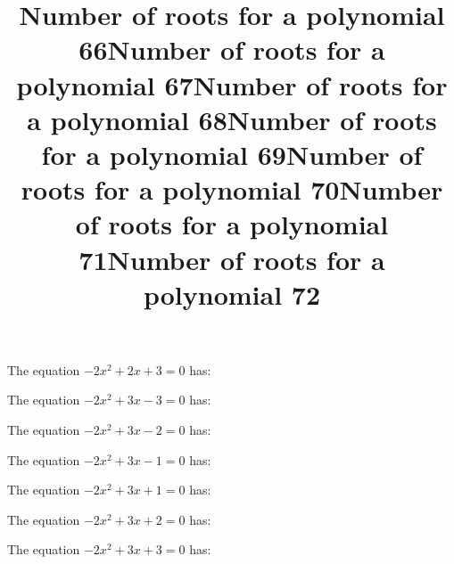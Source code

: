 \documentclass{article}
\begin{document}
\begin{category}
\begin{question}[multichoice]
\end{question}
\begin{question}[multichoice]
\title{Number of roots for a polynomial 66}
The equation $- 2 x^{2} + 2 x + 3=0$ has:



\end{question}
\begin{question}[multichoice]
\title{Number of roots for a polynomial 67}
The equation $- 2 x^{2} + 3 x - 3=0$ has:



\end{question}
\begin{question}[multichoice]
\title{Number of roots for a polynomial 68}
The equation $- 2 x^{2} + 3 x - 2=0$ has:



\end{question}
\begin{question}[multichoice]
\title{Number of roots for a polynomial 69}
The equation $- 2 x^{2} + 3 x - 1=0$ has:



\end{question}
\begin{question}[multichoice]
\title{Number of roots for a polynomial 70}
The equation $- 2 x^{2} + 3 x + 1=0$ has:



\end{question}
\begin{question}[multichoice]
\title{Number of roots for a polynomial 71}
The equation $- 2 x^{2} + 3 x + 2=0$ has:



\end{question}
\begin{question}[multichoice]
\title{Number of roots for a polynomial 72}
The equation $- 2 x^{2} + 3 x + 3=0$ has:


\end{question}
\end{category}
\end{document}
